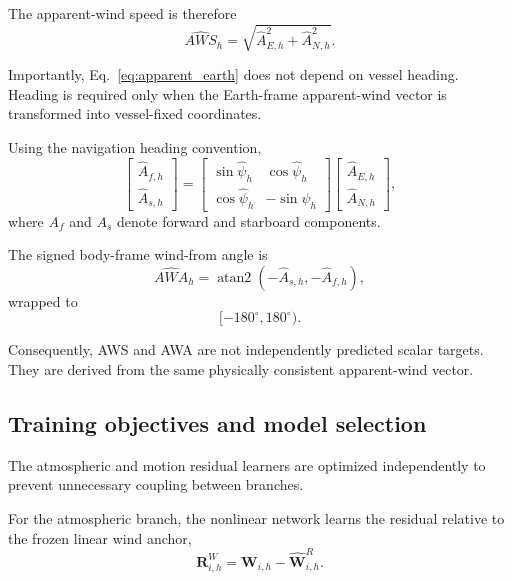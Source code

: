 The apparent-wind speed is therefore
\begin{equation}
\widehat{AWS}_h
=
\sqrt{
\hat A_{E,h}^{2}
+
\hat A_{N,h}^{2}
}.
\label{eq:aws}
\end{equation}

Importantly, Eq.~\eqref{eq:apparent_earth} does not depend on vessel heading. Heading is required only when the Earth-frame apparent-wind vector is transformed into vessel-fixed coordinates.

Using the navigation heading convention,
\begin{equation}
\begin{bmatrix}
\hat A_{f,h}\\
\hat A_{s,h}
\end{bmatrix}
=
\begin{bmatrix}
\sin\hat\psi_h & \cos\hat\psi_h\\
\cos\hat\psi_h & -\sin\hat\psi_h
\end{bmatrix}
\begin{bmatrix}
\hat A_{E,h}\\
\hat A_{N,h}
\end{bmatrix},
\label{eq:body_rotation}
\end{equation}
where $A_f$ and $A_s$ denote forward and starboard components.

The signed body-frame wind-from angle is
\begin{equation}
\widehat{AWA}_h
=
\operatorname{atan2}
\left(
-\hat A_{s,h},
-\hat A_{f,h}
\right),
\label{eq:awa}
\end{equation}
wrapped to
\begin{equation}
[-180^\circ,180^\circ).
\end{equation}

Consequently, AWS and AWA are not independently predicted scalar targets. They are derived from the same physically consistent apparent-wind vector.

\subsection{Training objectives and model selection}
\label{subsec:training_objectives}

The atmospheric and motion residual learners are optimized independently to prevent unnecessary coupling between branches.

For the atmospheric branch, the nonlinear network learns the residual relative to the frozen linear wind anchor,
\begin{equation}
\mathbf R^W_{i,h}
=
\mathbf W_{i,h}
-
\hat{\mathbf W}_{i,h}^{R}.
\label{eq:wind_residual_target}
\end{equation}


